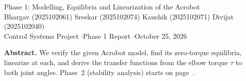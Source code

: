 \documentclass[10pt,letterpaper]{article}
\begin{document}
\begin{center}
\begin{singlespace}
{\fontsize{17}{20}\selectfont Phase 1: Modelling, Equilibria and Linearization of the Acrobot}\\[4pt]
{\small Bhargav (2025102061) \quad Sreekar (2025102074) \quad Kaushik (2025102071) \quad Divijat (2025102040)}\\[1pt]
{\footnotesize Control Systems Project \quad$\cdot$\quad Phase 1 Report \quad$\cdot$\quad October 25, 2026}
\end{singlespace}
\end{center}
\vspace{-6pt}
{\small\textbf{Abstract.} We verify the given Acrobot model, find its zero-torque equilibria, linearize at each, and derive the transfer functions from the elbow torque $\tau$ to both joint angles. Phase~2 (stability analysis) starts on page~\pageref{phase2}.\par}

\end{document}
